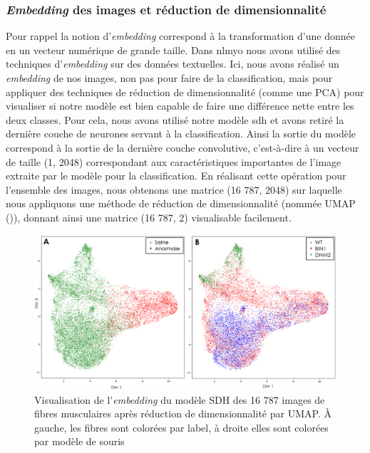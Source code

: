 \subsubsection{\textit{Embedding} des images et réduction de dimensionnalité} 
Pour rappel la notion d'\textit{embedding} correspond  à la transformation d'une donnée en un vecteur numérique de grande taille. Dans \gls{nlmyo} nous avons utilisé des techniques d'\textit{embedding} sur des données textuelles. Ici, nous avons réalisé un \textit{embedding} de nos images, non pas pour faire de la classification, mais pour appliquer des techniques de réduction de dimensionnalité (comme une PCA) pour visualiser si notre modèle est bien capable de faire une différence nette entre les deux classes.
Pour cela, nous avons utilisé notre modèle \gls{sdh} et avons retiré la dernière couche de neurones servant à la classification. Ainsi la sortie du modèle correspond à la sortie de la dernière couche convolutive, c'est-à-dire à un vecteur de taille (1, 2048) correspondant aux caractéristiques importantes de l'image extraite par le modèle pour la classification.  En réalisant cette opération pour l'ensemble des images, nous obtenons une matrice (16 787, 2048) sur laquelle nous appliquons une méthode de réduction de dimensionnalité (nommée UMAP (\cite{mcinnes_umap_2020})), donnant ainsi une matrice (16 787, 2) visualisable facilement.
\begin{figure}[!ht]
 \centering
 \includegraphics[width=1\textwidth]{figures/umap_sdh.png}
 \caption[Visualisation de l'\textit{embedding} du modèle SDH]{Visualisation de l'\textit{embedding} du modèle SDH des 16 787 images de fibres musculaires après réduction de dimensionnalité par UMAP. À gauche, les fibres sont colorées par label, à droite elles sont colorées par modèle de souris}
 \label{fig:umap_sdh}
\end{figure}

